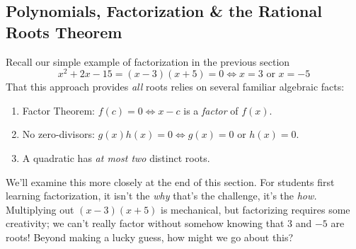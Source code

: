 \begin{exercises}{}{}
\begin{enumerate}
	\end{enumerate}
\end{exercises}

\clearpage



\subsection{Polynomials, Factorization \& the Rational Roots Theorem}

Recall our simple example of factorization in the previous section
\[
	x^2+2x-15=(x-3)(x+5)=0\iff x=3\text{ or }x=-5
\]
That this approach provides \emph{all} roots relies on several familiar algebraic facts:
\begin{enumerate}
  \item Factor Theorem: $f(c)=0\iff x-c$ is a \emph{factor} of $f(x)$.
  \item No zero-divisors: $g(x)h(x)=0\iff g(x)=0$ or $h(x)=0$. 
  \item A quadratic has \emph{at most two} distinct roots.
\end{enumerate}
We'll examine this more closely at the end of this section. For students first learning factorization, it isn't the \emph{why} that's the challenge, it's the \emph{how.} Multiplying out $(x-3)(x+5)$ is mechanical, but factorizing requires some creativity; we can't really factor without somehow knowing that 3 and $-5$ are roots! Beyond making a lucky guess, how might we go about this? 

